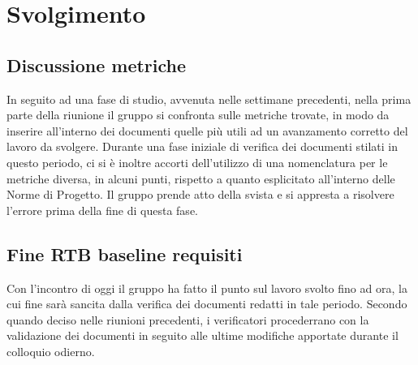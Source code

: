 \section{Svolgimento}
\subsection{Discussione metriche}
In seguito ad una fase di studio, avvenuta nelle settimane precedenti, nella prima parte della riunione il gruppo si confronta sulle metriche trovate, in modo da inserire all'interno dei documenti quelle più utili ad un avanzamento corretto del lavoro da svolgere. 
Durante una fase iniziale di verifica dei documenti stilati in questo periodo, ci si è inoltre accorti dell'utilizzo di una nomenclatura per le metriche diversa, in alcuni punti, rispetto a quanto esplicitato all'interno delle Norme di Progetto. Il gruppo prende atto della svista e si appresta a risolvere l'errore prima della fine di questa fase.

\subsection{Fine RTB baseline requisiti}
Con l'incontro di oggi il gruppo ha fatto il punto sul lavoro svolto fino ad ora, la cui fine sarà sancita dalla verifica dei documenti redatti in tale periodo. Secondo quando deciso nelle riunioni precedenti, i verificatori procederrano con la validazione dei documenti in seguito alle ultime modifiche apportate durante il colloquio odierno.

